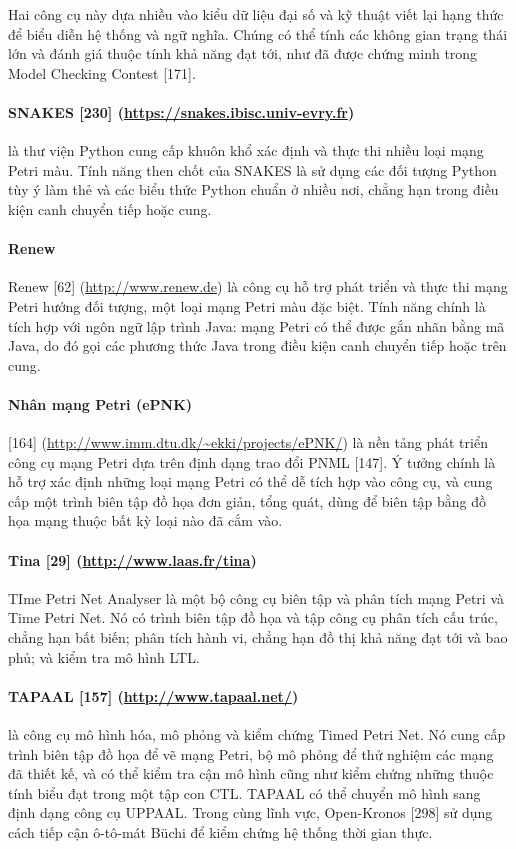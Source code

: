 Hai công cụ này dựa nhiều vào kiểu dữ liệu đại số và kỹ thuật viết lại hạng thức để biểu diễn hệ thống và ngữ nghĩa. Chúng có thể tính các không gian trạng thái lớn và đánh giá thuộc tính khả năng đạt tới, như đã được chứng minh trong Model Checking Contest [171].

\paragraph{SNAKES [230] (\url{https://snakes.ibisc.univ-evry.fr})}
là thư viện Python cung cấp khuôn khổ xác định và thực thi nhiều loại mạng Petri màu. Tính năng then chốt của SNAKES là sử dụng các đối tượng Python tùy ý làm thẻ và các biểu thức Python chuẩn ở nhiều nơi, chẳng hạn trong điều kiện canh chuyển tiếp hoặc cung.

\paragraph{Renew}
Renew [62] (\url{http://www.renew.de}) là công cụ hỗ trợ phát triển và thực thi mạng Petri hướng đối tượng, một loại mạng Petri màu đặc biệt. Tính năng chính là tích hợp với ngôn ngữ lập trình Java: mạng Petri có thể được gắn nhãn bằng mã Java, do đó gọi các phương thức Java trong điều kiện canh chuyển tiếp hoặc trên cung.

\paragraph{Nhân mạng Petri (ePNK)}
[164] (\url{http://www.imm.dtu.dk/~ekki/projects/ePNK/}) là nền tảng phát triển công cụ mạng Petri dựa trên định dạng trao đổi PNML [147]. Ý tưởng chính là hỗ trợ xác định những
loại mạng Petri có thể dễ tích hợp vào công cụ, và cung cấp một trình biên tập đồ họa đơn giản, tổng quát, dùng để biên tập bằng đồ họa mạng thuộc bất kỳ loại nào đã cắm vào.

\paragraph{Tina [29] (\url{http://www.laas.fr/tina})}
TIme Petri Net Analyser là một bộ công cụ biên tập và phân tích mạng Petri và Time Petri Net. Nó có trình biên tập đồ họa và tập công cụ phân tích cấu trúc, chẳng hạn bất biến; phân tích hành vi, chẳng hạn đồ thị khả năng đạt tới và bao phủ; và kiểm tra mô hình LTL.

\paragraph{TAPAAL [157] (\url{http://www.tapaal.net/})}
là công cụ mô hình hóa, mô phỏng và kiểm chứng Timed Petri Net. Nó cung cấp trình biên tập đồ họa để vẽ mạng Petri, bộ mô phỏng để thử nghiệm các mạng đã thiết kế, và có thể kiểm tra cận mô hình cũng như kiểm chứng những thuộc tính biểu đạt trong một tập con CTL. TAPAAL có thể chuyển mô hình sang định dạng công cụ UPPAAL. Trong cùng lĩnh vực, Open-Kronos [298] sử dụng cách tiếp cận ô-tô-mát Büchi để kiểm chứng hệ thống thời gian thực.

